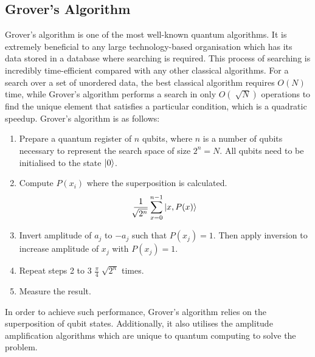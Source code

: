 \documentclass[12pt]{third-rep}
\begin{document}
\subsection{Grover's Algorithm}
Grover's algorithm is one of the most well-known quantum algorithms. It is extremely beneficial to any large technology-based organisation which has its data stored in a database where searching is required. This process of searching is incredibly time-efficient compared with any other classical algorithms. For a search over a set of unordered data, the best classical algorithm requires $O(N)$ time, while Grover's algorithm performs a search in only $O(\sqrt[]{N})$ operations to find the unique element that satisfies a particular condition, which is a quadratic speedup. Grover's algorithm is as follows:
\begin{enumerate}
\item Prepare a quantum register of $n$ qubits, where $n$ is a number of qubits necessary to represent the search space of size $2^n=N$. All qubits need to be initialised to the state ${\left\vert{0}\right\rangle}$.
\item Compute $P(x_i)$ where the superposition is calculated.
$$\frac{1}{\sqrt[]{2^n}}\sum_{x=0}^{n-1}{\left\vert{x,P(x)}\right\rangle}$$
\item Invert amplitude of $a_j$ to $-a_j$ such that $P(x_j)=1$. Then apply inversion to increase amplitude of $x_j$ with $P(x_j)=1$.
\item Repeat steps 2 to 3 $\frac{\pi}{4}\sqrt[]{2^n}$ times.
\item Measure the result.
\end{enumerate}
In order to achieve such performance, Grover's algorithm relies on the superposition of qubit states. Additionally, it also utilises the amplitude amplification algorithms which are unique to quantum computing to solve the problem.


%
\end{document}
